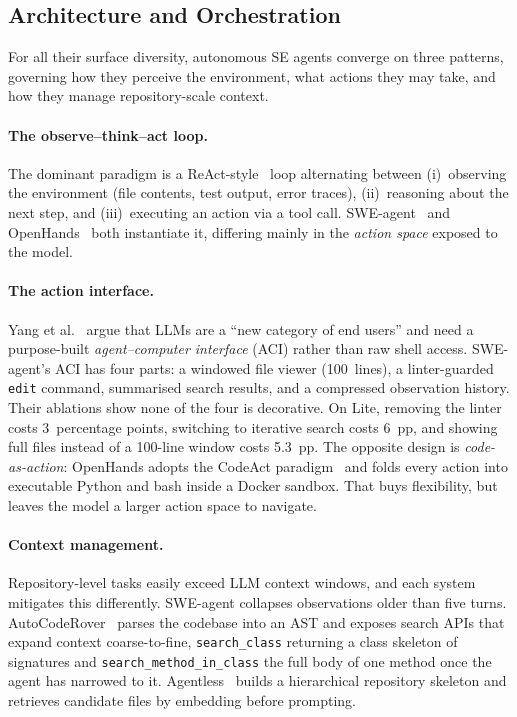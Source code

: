 \documentclass[
  english,        %
  font=times,     %
  twocolumn,      %
]{tumarticle}
\begin{document}
\subsection{Architecture and Orchestration}
\label{sec:e2e-arch}

For all their surface diversity, autonomous SE agents converge on three patterns,
governing how they perceive the environment, what actions they may take, and how
they manage repository-scale context.

\paragraph{The observe--think--act loop.}
The dominant paradigm is a ReAct-style~\cite{yao2023react} loop alternating
between (i)~observing the environment (file contents, test output, error traces),
(ii)~reasoning about the next step, and (iii)~executing an action via a tool call.
SWE-agent~\cite{yang2024sweagent} and OpenHands~\cite{wang2024openhands} both
instantiate it, differing mainly in the \emph{action space} exposed to the model.

\paragraph{The action interface.}
Yang et al.~\cite{yang2024sweagent} argue that LLMs are a ``new category of end
users'' and need a purpose-built \emph{agent--computer interface} (ACI) rather
than raw shell access. SWE-agent's ACI has four parts: a windowed file viewer
(100~lines), a linter-guarded \texttt{edit} command, summarised search results,
and a compressed observation history. Their ablations show none of the four is
decorative. On Lite, removing the linter costs 3~percentage points, switching to
iterative search costs 6~pp, and showing full files instead of a 100-line window
costs 5.3~pp. The opposite design is \emph{code-as-action}: OpenHands adopts the
CodeAct paradigm~\cite{wang2024codeact} and folds every action into executable
Python and bash inside a Docker sandbox. That buys flexibility, but leaves the
model a larger action space to navigate.

\paragraph{Context management.}
Repository-level tasks easily exceed LLM context windows, and each system
mitigates this differently. SWE-agent collapses observations older than five turns.
AutoCodeRover~\cite{zhang2024autocoderover} parses the codebase into an AST and
exposes search APIs that expand context coarse-to-fine, \texttt{search\_class}
returning a class skeleton of signatures and \texttt{search\_method\_in\_class}
the full body of one method once the agent has narrowed to it.
Agentless~\cite{xia2024agentless} builds a hierarchical repository skeleton and
retrieves candidate files by embedding before prompting.
\end{document}

